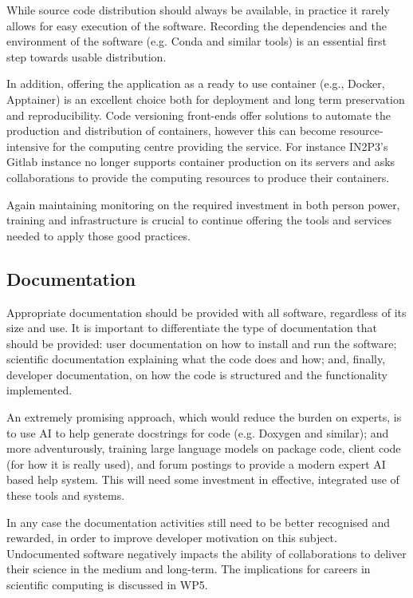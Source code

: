 While source code distribution should always be available, in practice it rarely allows for easy execution of the software. Recording the dependencies and the environment of the software (e.g. Conda and similar tools) is an essential first step towards usable distribution.

In addition, offering the application as a ready to use container (e.g., Docker, Apptainer) is an excellent choice both for deployment and long term preservation and reproducibility. Code versioning front-ends offer solutions to automate the production and distribution of containers, however this can become resource-intensive for the computing centre providing the service. For instance IN2P3’s Gitlab instance no longer supports container production on its servers and asks collaborations to provide the computing resources to produce their containers.

Again maintaining monitoring on the required  investment in both person power, training and infrastructure is crucial to continue offering the tools and services needed to apply those good practices.


\subsection{Documentation}

Appropriate documentation should be provided with all software, regardless of its size and use. It is important to differentiate the type of documentation that should be provided: user documentation on how to install and run the software; scientific documentation explaining what the code does and how; and, finally, developer documentation, on how the code is structured and the functionality implemented.

An extremely promising approach, which would reduce the burden on experts, is to use AI to help generate docstrings for code (e.g. Doxygen and similar); and more adventurously, training large language models on package code, client code (for how it is really used), and forum postings to provide a modern expert AI based help system. This will need some investment in effective, integrated use of these tools and systems.

In any case the documentation activities still need to be better recognised and rewarded, in order to improve developer motivation on this subject.  Undocumented software negatively impacts the ability of collaborations to deliver their science in the medium and long-term.  The implications for careers in scientific computing is discussed in WP5.


